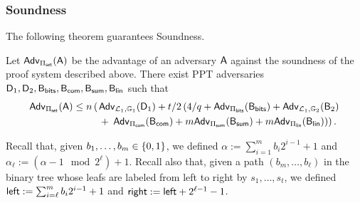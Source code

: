 \subsubsection{Soundness}

The following theorem guarantees Soundness. 
 
\begin{theorem} Let \(\mathsf{Adv}_{{\Pi_{\mathsf{set}}}}(\mathsf{A})\) 
be the advantage of an adversary \(\mathsf{A}\) against the soundness of 
the proof system  described above. There exist PPT adversaries
\(\mathsf{D}_1,\mathsf{D}_2,\mathsf{B}_{\mathsf{bits}},\mathsf{B}_{\mathsf{com}},\mathsf{B}_{\mathsf{sum}},\mathsf{B}_\mathsf{lin}\) such that 
\begin{align*}
\mathsf{Adv}_{{\Pi_{\mathsf{set}}}}(\mathsf{A}) \leq 
n \left(\right.
    &\mathsf{Adv}_{\mathcal{L}_1,\mathbb{G}_1}(\mathsf{D}_1) 
        + t /2\left(4/q
            +  \mathsf{Adv}_{\Pi_{\mathsf{bits}}}(\mathsf{B}_{\mathsf{bits}})
            +  \mathsf{Adv}_{\mathcal{L}_1,\mathbb{G}_2}(\mathsf{B}_2)\right. \\
    &+ \left.\left.\mathsf{Adv}_{{\Pi_{\mathsf{com}}}}(\mathsf{B}_{\mathsf{com}})
        + m\mathsf{Adv}_{{\Pi_{\mathsf{sum}}}}(\mathsf{B}_{\mathsf{sum}})
        + m\mathsf{Adv}_{{\Pi_\mathsf{lin}}}(\mathsf{B}_\mathsf{lin})\right)\right).
\end{align*}
\label{teo:bitstr-soundness}
\end{theorem}

Recall that, given $b_1,\ldots,b_m\in\{0,1\}$, we defined $\alpha:=\sum_{i=1}^mb_i2^{i-1}+1$ and $\alpha_\ell:=(\alpha-1\mod 2^\ell)+1$. Recall also that, given a path $(b_m,\ldots, b_\ell)$ in the binary tree whose leafs are labeled from left to right by $s_1,\ldots,s_t$, we defined ${\mathsf{left}}:=\sum_{i=\ell}^m b_i2^{i-1}+1$ and ${\mathsf{right}}:={\mathsf{left}}+2^{\ell-1}-1$.

